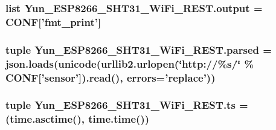 \hypertarget{namespaceYun__ESP8266__SHT31__WiFi__REST_acb18c36bfe11f9d6ae35ec9914ff386f}{
\subsubsection[{output}]{\setlength{\rightskip}{0pt plus 5cm}list Yun\-\_\-\-E\-S\-P8266\-\_\-\-S\-H\-T31\-\_\-\-Wi\-Fi\-\_\-\-R\-E\-S\-T.\-output = {\bf C\-O\-N\-F}\mbox{[}'fmt\-\_\-print'\mbox{]}}}\label{namespaceYun__ESP8266__SHT31__WiFi__REST_acb18c36bfe11f9d6ae35ec9914ff386f}
\hypertarget{namespaceYun__ESP8266__SHT31__WiFi__REST_a46b22ae14dfeb87a7f7a7d7a2bbe79ab}{
\subsubsection[{parsed}]{\setlength{\rightskip}{0pt plus 5cm}tuple Yun\-\_\-\-E\-S\-P8266\-\_\-\-S\-H\-T31\-\_\-\-Wi\-Fi\-\_\-\-R\-E\-S\-T.\-parsed = json.\-loads(unicode(urllib2.\-urlopen(\char`\"{}http\-://\%s/\char`\"{} \% C\-O\-N\-F\mbox{[}'{\bf sensor}'\mbox{]}).read(), {\bf errors}='replace'))}}\label{namespaceYun__ESP8266__SHT31__WiFi__REST_a46b22ae14dfeb87a7f7a7d7a2bbe79ab}
\hypertarget{namespaceYun__ESP8266__SHT31__WiFi__REST_a7770630e75551836c5d8dc48c3321a6a}{
\subsubsection[{ts}]{\setlength{\rightskip}{0pt plus 5cm}tuple Yun\-\_\-\-E\-S\-P8266\-\_\-\-S\-H\-T31\-\_\-\-Wi\-Fi\-\_\-\-R\-E\-S\-T.\-ts = (time.\-asctime(), time.\-time())}}\label{namespaceYun__ESP8266__SHT31__WiFi__REST_a7770630e75551836c5d8dc48c3321a6a}
